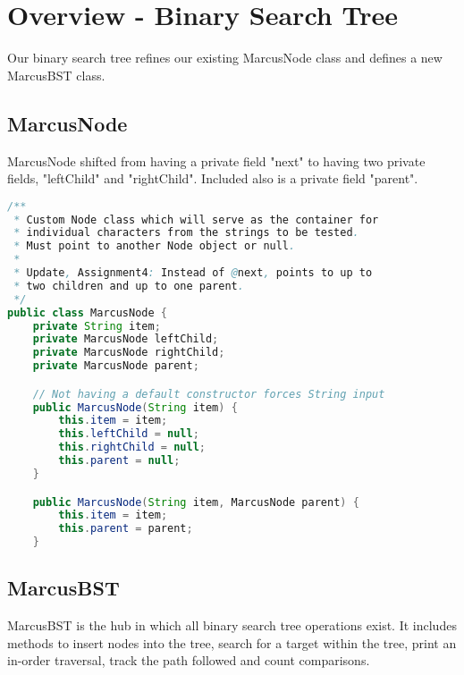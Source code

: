 \documentclass[letterpaper, 10pt]{article}
\begin{document}
\section{Overview - Binary Search Tree}

\hspace{1.0em}Our binary search tree refines our existing MarcusNode class and defines a new MarcusBST class.

\subsection{MarcusNode}

\hspace{1.0em}MarcusNode shifted from having a private field "next" to having two private fields, "leftChild" and "rightChild". Included also is a private field "parent".

\begin{lstlisting}[language=Java, firstnumber=1]
/**
 * Custom Node class which will serve as the container for
 * individual characters from the strings to be tested.
 * Must point to another Node object or null.
 * 
 * Update, Assignment4: Instead of @next, points to up to
 * two children and up to one parent.
 */
public class MarcusNode {
    private String item;
    private MarcusNode leftChild;
    private MarcusNode rightChild;
    private MarcusNode parent;

    // Not having a default constructor forces String input
    public MarcusNode(String item) {
        this.item = item;
        this.leftChild = null;
        this.rightChild = null;
        this.parent = null;
    }

    public MarcusNode(String item, MarcusNode parent) {
        this.item = item;
        this.parent = parent;
    }

\end{lstlisting}

\subsection{MarcusBST}

\hspace{1.0em}MarcusBST is the hub in which all binary search tree operations exist. It includes methods to insert nodes into the tree, search for a target within the tree, print an in-order traversal, track the path followed and count comparisons.

\vspace{2.0em}
\end{document}
